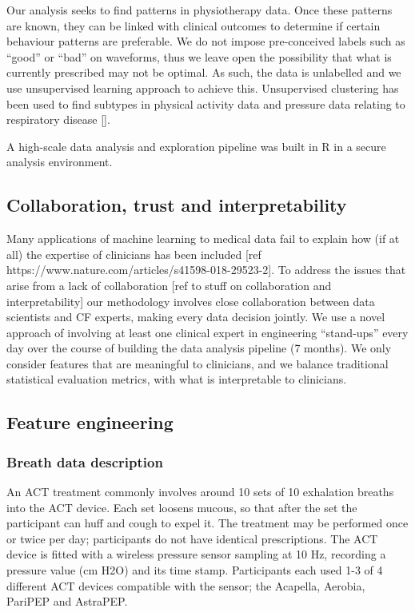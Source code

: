 \documentclass{article}
\begin{document}
Our analysis seeks to find patterns in physiotherapy data. Once these patterns are known, they can be linked with clinical outcomes to determine if certain behaviour patterns are preferable. We do not impose pre-conceived labels such as “good” or “bad” on waveforms, thus we leave open the possibility that what is currently prescribed may not be optimal. As such, the data is unlabelled and we use unsupervised learning approach to achieve this. Unsupervised clustering has been used to find subtypes in physical activity data \cite{physical_activity_patterns_2017} and pressure data relating to respiratory disease []. 

A high-scale data analysis and exploration pipeline was built in R in a secure analysis environment.  

\subsection{Collaboration, trust and interpretability}
Many applications of machine learning to medical data fail to explain how (if at all) the expertise of clinicians has been included [ref https://www.nature.com/articles/s41598-018-29523-2]. To address the issues that arise from a lack of collaboration [ref to stuff on collaboration and interpretability] our methodology involves close collaboration between data scientists and CF experts, making every data decision jointly. We use a novel approach of involving at least one clinical expert in engineering “stand-ups” every day over the course of building the data analysis pipeline (7 months). We only consider features that are meaningful to clinicians, and we balance traditional statistical evaluation metrics, with what is interpretable to clinicians.  

\subsection{Feature engineering}
\subsubsection{Breath data description}
An ACT treatment commonly involves around 10 sets of 10 exhalation breaths into the ACT device. Each set loosens mucous, so that after the set the participant can huff and cough to expel it. The treatment may be performed once or twice per day; participants do not have identical prescriptions. The ACT device is fitted with a wireless pressure sensor sampling at 10 Hz, recording a pressure value (cm H2O) and its time stamp. Participants each used 1-3 of 4 different ACT devices compatible with the sensor; the Acapella, Aerobia, PariPEP and AstraPEP.  
\end{document}
